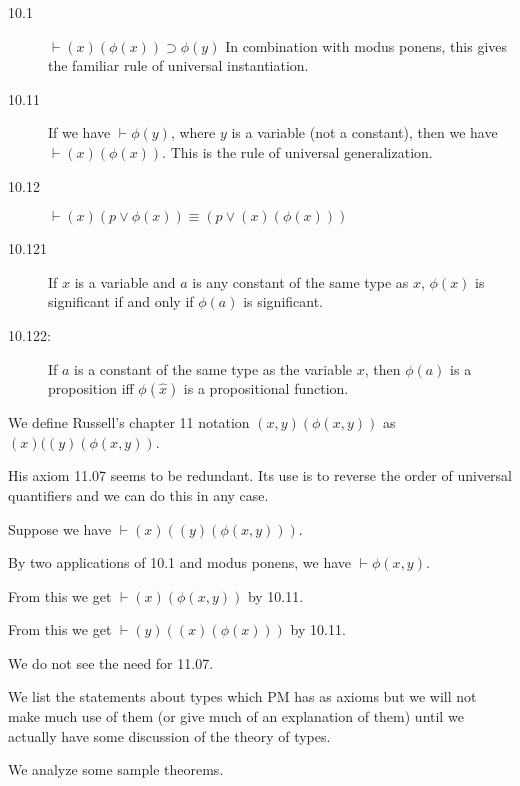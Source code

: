 \documentclass[12pt]{article}
\begin{document}
\begin{description}

\item[10.1]  $\vdash (x)(\phi(x)) \supset \phi(y)$  In combination with modus ponens, this gives the familiar rule of universal instantiation.

\item[10.11] If we have $\vdash \phi(y)$, where $y$ is a variable (not a constant), then we have $\vdash (x)(\phi(x))$.  This is the rule of universal generalization.

\item[10.12]  $\vdash (x)(p \vee \phi(x)) \equiv (p \vee (x)(\phi(x)))$

\item[10.121]  If $x$ is a variable and $a$ is any constant of the same type as $x$, $\phi(x)$ is significant if and only if $\phi(a)$ is significant.

\item[10.122:]  If $a$ is a constant of the same type as the variable $x$, then $\phi(a)$ is a proposition iff $\phi(\hat{x})$ is a propositional function.



\end{description}

We define Russell's chapter 11 notation $(x,y)(\phi(x,y))$ as $(x)((y)(\phi(x,y))$.

His axiom 11.07 seems to be redundant.  Its use is to reverse the order of universal quantifiers and we can do this in any case.

Suppose we have $\vdash (x)((y)(\phi(x,y)))$.

By two applications of 10.1 and modus ponens, we have $\vdash \phi(x,y)$.

From this we get $\vdash (x)(\phi(x,y))$ by 10.11.

From this we get $\vdash (y)((x)(\phi(x)))$ by 10.11.

We do not see the need for 11.07.

We list the statements about types which PM has as axioms but we will not make much use of them (or give much of an explanation of them) until we actually have some discussion of the theory of types.

We analyze some sample theorems.
\end{document}
